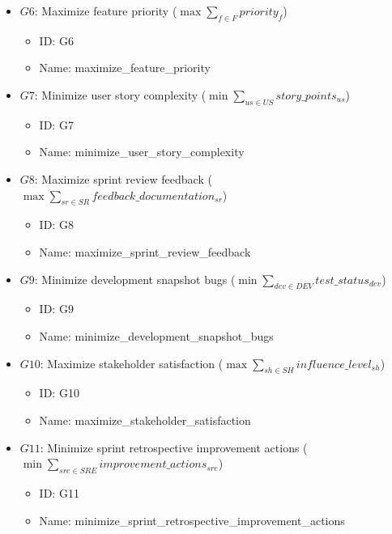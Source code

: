 \documentclass{article}
\begin{document}
\begin{itemize}
\begin{itemize}
        \end{itemize}
    \item $G6$: Maximize feature priority ($\max \sum_{f \in F} priority_f$)
        \begin{itemize}
            \item ID: G6
            \item Name: maximize\_feature\_priority
        \end{itemize}
    \item $G7$: Minimize user story complexity ($\min \sum_{us \in US} story\_points_{us}$)
        \begin{itemize}
            \item ID: G7
            \item Name: minimize\_user\_story\_complexity
        \end{itemize}
    \item $G8$: Maximize sprint review feedback ($\max \sum_{sr \in SR} feedback\_documentation_{sr}$)
        \begin{itemize}
            \item ID: G8
            \item Name: maximize\_sprint\_review\_feedback
        \end{itemize}
    \item $G9$: Minimize development snapshot bugs ($\min \sum_{dev \in DEV} test\_status_{dev}$)
        \begin{itemize}
            \item ID: G9
            \item Name: minimize\_development\_snapshot\_bugs
        \end{itemize}
    \item $G10$: Maximize stakeholder satisfaction ($\max \sum_{sh \in SH} influence\_level_{sh}$)
        \begin{itemize}
            \item ID: G10
            \item Name: maximize\_stakeholder\_satisfaction
        \end{itemize}
    \item $G11$: Minimize sprint retrospective improvement actions ($\min \sum_{sre \in SRE} improvement\_actions_{sre}$)
        \begin{itemize}
            \item ID: G11
            \item Name: minimize\_sprint\_retrospective\_improvement\_actions
        \end{itemize}

\end{itemize}
\end{document}
